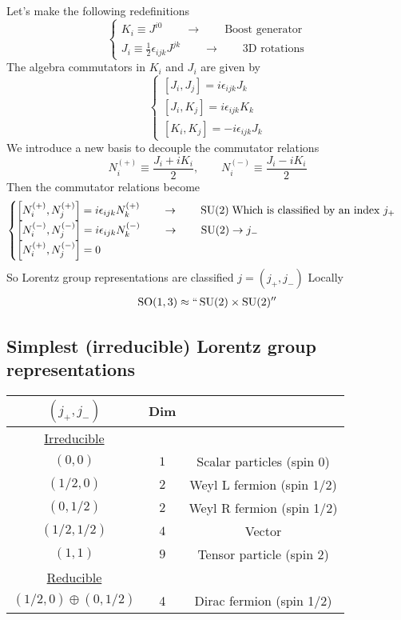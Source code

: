 Let's make the following redefinitions
\[ \begin{cases}
K_i \equiv J^{i0} \qquad \to \qquad \text{Boost generator} \\
J_i \equiv \frac{1}{2}\epsilon_{ijk}J^{jk} \qquad \to \qquad \text{3D rotations}
\end{cases} \]
The algebra commutators in $K_i$ and $J_i$ are given by
\[ \begin{cases}
[J_i,J_j] = i\epsilon_{ijk}J_k\\
[J_i,K_j] = i\epsilon_{ijk}K_k\\
[K_i,K_j] = -i\epsilon_{ijk}J_k
\end{cases} \]
We introduce a new basis to decouple the commutator relations
\[ N_i^{(+)} \equiv \frac{J_i+iK_i}{2}, \qquad N_i^{(-)} \equiv \frac{J_i-iK_i}{2} \]
Then the commutator relations become
\[ \begin{cases}
\left[N_i^{(+)},N_j^{(+)}\right] = i\epsilon_{ijk}N_k^{(+)} \qquad \to \qquad\operatorname{SU}(2) \; \text{Which is classified by an index $j_+$} \\
\left[N_i^{(-)},N_j^{(-)}\right] = i\epsilon_{ijk}N_k^{(-)} \qquad \to \qquad\operatorname{SU}(2) \to j_- \\
\left[N_i^{(+)},N_j^{(-)}\right] = 0
\end{cases} \]
So Lorentz group representations are classified $j=(j_+,j_-)$
Locally
\begin{align*}
\operatorname{SO}(1,3) \approx ``\operatorname{SU}(2)\times\operatorname{SU}(2)''
\end{align*}

\subsection{Simplest (irreducible) Lorentz group representations}
\begin{tabular}{c c c}
$(j_+,j_-)$ & Dim & \\ \hline
\underline{Irreducible} \\ 
$(0,0)$ & $1$ & Scalar particles (spin 0) \\
$(1/2,0)$ & $2$ & Weyl L fermion (spin 1/2) \\
$(0,1/2)$ & $2$ & Weyl R fermion (spin 1/2) \\
$(1/2,1/2)$ & $4$ & Vector \\
$(1,1)$ & $9$ & Tensor particle (spin 2) \\ \hline
\underline{Reducible} \\
$(1/2,0)\oplus(0,1/2)$ & 4 & Dirac fermion (spin 1/2)
\end{tabular}

